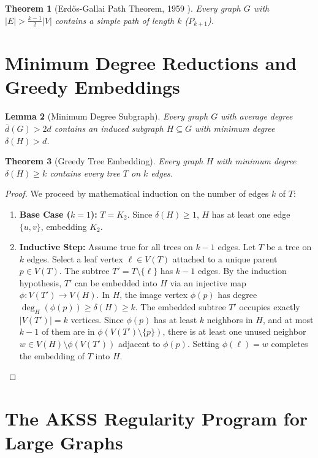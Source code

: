 \documentclass[11pt,a4paper]{article}
\newtheorem{theorem}{Theorem}[section]
\newtheorem{lemma}[theorem]{Lemma}
\theoremstyle{definition}
\begin{document}
\begin{theorem}[Erd\H{o}s-Gallai Path Theorem, 1959 \cite{erdos1959gallai}]\label{thm:erdos_gallai}
Every graph $G$ with $|E| > \frac{k - 1}{2} |V|$ contains a simple path of length $k$ ($P_{k+1}$).
\end{theorem}

\section{Minimum Degree Reductions and Greedy Embeddings}

\begin{lemma}[Minimum Degree Subgraph]\label{lem:min_deg}
Every graph $G$ with average degree $\bar{d}(G) > 2d$ contains an induced subgraph $H \subseteq G$ with minimum degree $\delta(H) > d$.
\end{lemma}

\begin{theorem}[Greedy Tree Embedding]\label{thm:greedy_tree}
Every graph $H$ with minimum degree $\delta(H) \ge k$ contains every tree $T$ on $k$ edges.
\end{theorem}

\begin{proof}
We proceed by mathematical induction on the number of edges $k$ of $T$:
\begin{enumerate}
    \item \textbf{Base Case ($k = 1$):} $T = K_2$. Since $\delta(H) \ge 1$, $H$ has at least one edge $\{u, v\}$, embedding $K_2$.
    \item \textbf{Inductive Step:} Assume true for all trees on $k - 1$ edges.
    Let $T$ be a tree on $k$ edges. Select a leaf vertex $\ell \in V(T)$ attached to a unique parent $p \in V(T)$.
    The subtree $T' = T \setminus \{\ell\}$ has $k - 1$ edges.
    By the induction hypothesis, $T'$ can be embedded into $H$ via an injective map $\phi : V(T') \to V(H)$.
    In $H$, the image vertex $\phi(p)$ has degree $\deg_H(\phi(p)) \ge \delta(H) \ge k$.
    The embedded subtree $T'$ occupies exactly $|V(T')| = k$ vertices.
    Since $\phi(p)$ has at least $k$ neighbors in $H$, and at most $k - 1$ of them are in $\phi(V(T') \setminus \{p\})$, there is at least one unused neighbor $w \in V(H) \setminus \phi(V(T'))$ adjacent to $\phi(p)$.
    Setting $\phi(\ell) = w$ completes the embedding of $T$ into $H$.
\end{enumerate}
\end{proof}

\section{The AKSS Regularity Program for Large Graphs}
\end{document}
